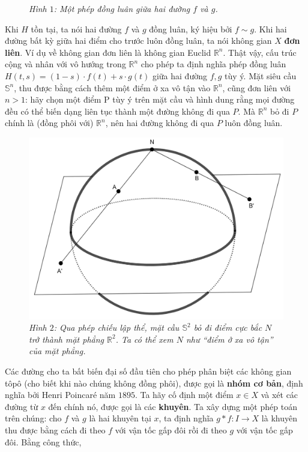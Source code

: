\begin{multicols}{2}
\begin{figure}[H]
		\caption{\small\textit{\color{duongvaotoanhoc}Hình $1$: Một phép đồng luân giữa hai đường $f$ và $g$.}}
		\vspace*{-10pt}
	\end{figure}
	Khi $H$ tồn tại, ta nói hai đường $f$ và $g$ đồng luân, ký hiệu bởi $f \sim g$. Khi hai đường bất kỳ giữa hai điểm cho trước luôn đồng luân, ta nói không gian $X$ {\bf\color{duongvaotoanhoc} đơn liên}. Ví dụ về không gian đơn liên là không gian Euclid $\mathbb{R}^n$. Thật vậy, cấu trúc cộng và nhân với vô hướng trong $\mathbb{R}^n$ cho phép ta định nghĩa phép đồng luân $H(t,s) = (1-s) \cdot f(t) + s \cdot g(t)$ giữa hai đường $f, g$ tùy ý. Mặt  siêu cầu $\mathbb{S}^n$, thu được bằng cách thêm một điểm ở xa vô tận vào $\mathbb{R}^n$, cũng đơn liên với $n > 1$: hãy chọn một điểm P tùy ý trên mặt cầu và hình dung rằng mọi đường đều có thể biến dạng liên tục thành một đường không đi qua $P$. Mà $\mathbb{R}^n$ bỏ đi $P$ chính là (đồng phôi với) $\mathbb{R}^n$, nên hai đường không đi qua $P$ luôn đồng luân.
		\begin{figure}[H]
		\vspace*{-5pt}
		\centering
		\captionsetup{labelformat= empty, justification=centering}
		\includegraphics[width= 0.9\linewidth]{h2.png}
		\caption{\small\textit{\color{duongvaotoanhoc}Hình $2$: Qua phép chiếu lập thể, mặt cầu $\mathbb{S}^2$ bỏ đi điểm cực bắc $N$ trở thành mặt phẳng $\mathbb{R}^2$. Ta có thể xem $N$ như ``điểm ở xa vô tận'' của mặt phẳng.}}
		\vspace*{-10pt}
	\end{figure}
	Các đường cho ta bất biến đại số đầu tiên cho phép phân biệt các không gian tôpô (cho biết khi nào chúng không đồng phôi), được gọi là {\bf\color{duongvaotoanhoc} nhóm cơ bản}, định nghĩa bởi Henri Poincaré năm $1895$. Ta hãy cố định một điểm $x \in X$ và xét các đường từ $x$ đến chính nó, được gọi là các {\bf\color{duongvaotoanhoc} khuyên}. Ta xây dựng một phép toán trên chúng: cho $f$ và $g$ là hai khuyên tại $x$, ta định nghĩa $g \ast f: I \to X$ là khuyên thu được bằng cách đi theo $f$ với vận tốc gấp đôi rồi đi theo $g$ với vận tốc gấp đôi. Bằng công thức, 

\end{multicols}
